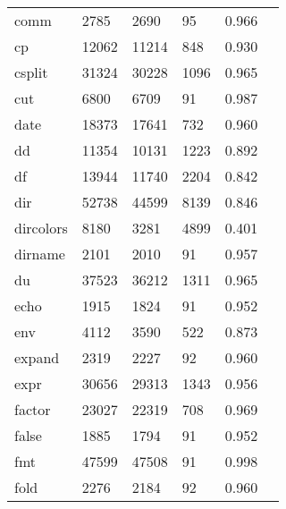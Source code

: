 \begin{longtable}{lp{2.20cm}p{2.20cm}p{2.20cm}p{2.20cm}p{2.20cm}}
comm      &                     2785 &         2690 &            95 &                    0.966 \\
cp        &                    12062 &        11214 &           848 &                    0.930 \\
csplit    &                    31324 &        30228 &          1096 &                    0.965 \\
cut       &                     6800 &         6709 &            91 &                    0.987 \\
date      &                    18373 &        17641 &           732 &                    0.960 \\
dd        &                    11354 &        10131 &          1223 &                    0.892 \\
df        &                    13944 &        11740 &          2204 &                    0.842 \\
dir       &                    52738 &        44599 &          8139 &                    0.846 \\
dircolors &                     8180 &         3281 &          4899 &                    0.401 \\
dirname   &                     2101 &         2010 &            91 &                    0.957 \\
du        &                    37523 &        36212 &          1311 &                    0.965 \\
echo      &                     1915 &         1824 &            91 &                    0.952 \\
env       &                     4112 &         3590 &           522 &                    0.873 \\
expand    &                     2319 &         2227 &            92 &                    0.960 \\
expr      &                    30656 &        29313 &          1343 &                    0.956 \\
factor    &                    23027 &        22319 &           708 &                    0.969 \\
false     &                     1885 &         1794 &            91 &                    0.952 \\
fmt       &                    47599 &        47508 &            91 &                    0.998 \\
fold      &                     2276 &         2184 &            92 &                    0.960 \\

\end{longtable}

